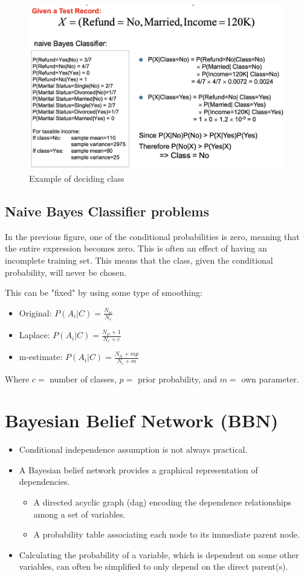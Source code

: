 \bigskip
\begin{figure}[H]
\centering
\includegraphics[scale=0.4]{figures/prob_est_data.png}
\caption{Example of deciding class}
\end{figure}

\subsection{Naive Bayes Classifier problems}
In the previous figure, one of the conditional probabilities is zero, meaning that the entire expression becomes zero.
This is often an effect of having an incomplete training set. This means that the class, given the conditional probability, will never be chosen.

This can be "fixed" by using some type of smoothing:
\begin{itemize}
    \item Original: $P(A_i|C) = \frac{N_{ic}}{N_c}$
    \item Laplace: $P(A_i|C) = \frac{N_{ic}+1}{N_c+c}$
    \item m-estimate: $P(A_i|C) = \frac{N_{ic}+mp}{N_c+m}$
\end{itemize}

Where $c =$ number of classes, $p =$ prior probability, and $m =$ own parameter.

\section{Bayesian Belief Network (BBN)}
\begin{itemize}
    \item Conditional independence assumption is not always practical.
    \item A Bayesian belief network provides a graphical representation of dependencies.
    \begin{itemize}
        \item A directed acyclic graph (dag) encoding the dependence relationships among a set of variables.
        \item A probability table associating each node to its immediate parent node.
    \end{itemize}
    \item Calculating the probability of a variable, which is dependent on some other variables, can often be simplified to only depend on the direct parent(s).
\end{itemize}

